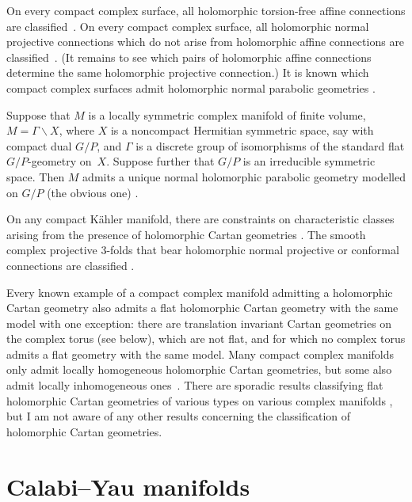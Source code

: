 \documentclass[pdftex]{sigma}
\begin{document}
On every compact complex surface, all holomorphic torsion-free
af\/f\/ine connections are classif\/ied~\cite{Klingler:1998,Dumitrescu:2010b}.
On every compact complex surface,
all holomorphic normal projective connections
which do not arise from holomorphic
af\/f\/ine connections are classif\/ied~\cite{Klingler:1998,Dumitrescu:2010b}.
(It remains to see which pairs of holomorphic af\/f\/ine connections
determine the same holomorphic projective connection.)
It is known which compact complex surfaces admit
holomorphic normal parabolic geometries
\cite{Inoue/Kobayashi/Ochiai:1980,Kobayashi/Horst:1983,%
KobayashiOchiai:1980,Kobayashi/Ochiai:1981ii,Kobayashi/Ochiai:1982}.

Suppose that $M$ is a locally symmetric
complex manifold of f\/inite volume,
$M=\Gamma \backslash X$, where $X$
is a noncompact Hermitian symmetric space, say with
compact dual $G/P$,
and $\Gamma$ is a discrete group of isomorphisms
of the standard f\/lat $G/P$-geometry on~$X$.
Suppose further
that $G/P$ is an irreducible symmetric space.
Then $M$ admits a unique normal holomorphic
parabolic geometry modelled on $G/P$ (the obvious one)
\cite{Kobayashi/Ochiai:1981,Klingler:2001}.

On any compact K{\"a}hler manifold,
there are constraints on characteristic classes
arising from the presence of holomorphic Cartan
geometries \cite{Kobayashi/Ochiai:1981,McKay:2011c}.
The smooth complex projective 3-folds that bear
holomorphic normal projective or
conformal connections are classif\/ied
\cite{Jahnke/Radloff:2002,Jahnke/Radloff:2004}.

Every known example of a compact complex manifold
admitting a holomorphic Cartan geo\-met\-ry
also admits a f\/lat holomorphic Cartan geometry
with the same model with one exception: there are translation
invariant Cartan geometries on the complex torus (see below),
which are not f\/lat, and for which no complex torus admits
a f\/lat geometry with the same model.
Many compact complex manifolds only admit locally
homogeneous holomorphic Cartan geometries, but some
also admit locally inhomogeneous ones~\cite{Dumitrescu:2010b}.
There are sporadic results classifying f\/lat holomorphic
Cartan geometries of various types on various complex
manifolds \cite{McKay/Pokrovskiy:2010}, but
I am not aware of any other results concerning the
classif\/ication of holomorphic Cartan geometries.

\section[Calabi-Yau manifolds]{Calabi--Yau manifolds}
\end{document}

